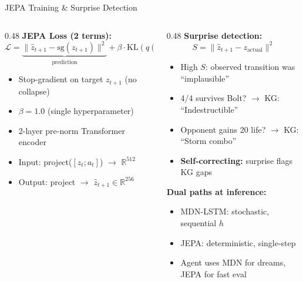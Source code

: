 \documentclass[aspectratio=169, 10pt]{beamer}
\begin{document}
\begin{frame}{JEPA Training \& Surprise Detection}
  \begin{columns}[T]
    \begin{column}{0.48\textwidth}
      \footnotesize
      \textbf{JEPA Loss (2 terms):}
      $$\mathcal{L} = \underbrace{\|\hat{z}_{t+1} - \text{sg}(z_{t+1})\|^2}_{\text{prediction}}
        + \beta \cdot \underbrace{\text{KL}(q(z) \| \mathcal{N}(0,I))}_{\text{regularizer}}$$
      \begin{itemize}\scriptsize
        \item Stop-gradient on target $z_{t+1}$ (no collapse)
        \item $\beta = 1.0$ (single hyperparameter)
        \item 2-layer pre-norm Transformer encoder
        \item Input: project($[z_t; a_t]$) $\to$ $\mathbb{R}^{512}$
        \item Output: project $\to$ $\hat{z}_{t+1} \in \mathbb{R}^{256}$
      \end{itemize}
    \end{column}
    \begin{column}{0.48\textwidth}
      \footnotesize
      \textbf{Surprise detection:}
      $$S = \|\hat{z}_{t+1} - z_{\text{actual}}\|^2$$
      \begin{itemize}\scriptsize
        \item High $S$: observed transition was ``implausible''
        \item 4/4 survives Bolt? $\to$ KG: ``Indestructible''
        \item Opponent gains 20 life? $\to$ KG: ``Storm combo''
        \item \textbf{Self-correcting:} surprise flags KG gaps
      \end{itemize}
      \vspace{0.2cm}
      \textbf{Dual paths at inference:}
      \begin{itemize}\scriptsize
        \item MDN-LSTM: stochastic, sequential $h$
        \item JEPA: deterministic, single-step
        \item Agent uses MDN for dreams, JEPA for fast eval
      \end{itemize}
    \end{column}
  \end{columns}
\end{frame}
\end{document}

